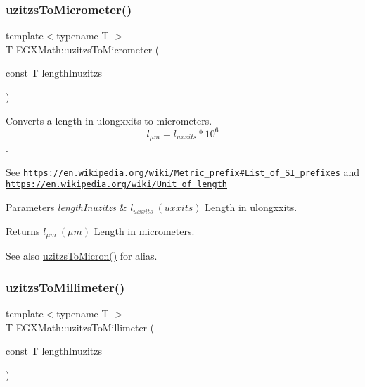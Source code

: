 \subsubsection{\texorpdfstring{uzitzs\+To\+Micrometer()}{uzitzsToMicrometer()}}
{\footnotesize\ttfamily template$<$typename T $>$ \\
T E\+G\+X\+Math\+::uzitzs\+To\+Micrometer (\begin{DoxyParamCaption}\item[{const T}]{length\+Inuzitzs }\end{DoxyParamCaption})}



Converts a length in ulongxxits to micrometers. \[ l_{\mu m}=l_{uxxits} * 10^{6} \]. 

See \href{https://en.wikipedia.org/wiki/Metric_prefix#List_of_SI_prefixes}{\tt https\+://en.\+wikipedia.\+org/wiki/\+Metric\+\_\+prefix\#\+List\+\_\+of\+\_\+\+S\+I\+\_\+prefixes} and \href{https://en.wikipedia.org/wiki/Unit_of_length}{\tt https\+://en.\+wikipedia.\+org/wiki/\+Unit\+\_\+of\+\_\+length} 
\begin{DoxyParams}{Parameters}
{\em length\+Inuzitzs} & $ l_{uxxits}\ (uxxits)$ Length in ulongxxits. \\
\hline
\end{DoxyParams}
\begin{DoxyReturn}{Returns}
$ l_{\mu m}\ (\mu m)$ Length in micrometers. 
\end{DoxyReturn}
\begin{DoxySeeAlso}{See also}
\mbox{\hyperlink{group___e_g_x_math-_conversions-_length_conversions-uzitzs-_non-_s_i_ga695a8fd8870537930d6378e99ad2aa9f}{uzitzs\+To\+Micron()}} for alias. 
\end{DoxySeeAlso}
\mbox{\label{group___e_g_x_math-_conversions-_length_conversions-uzitzs-_s_i_gaf507dd646327861da523586b417d132e}} 
\subsubsection{\texorpdfstring{uzitzs\+To\+Millimeter()}{uzitzsToMillimeter()}}
{\footnotesize\ttfamily template$<$typename T $>$ \\
T E\+G\+X\+Math\+::uzitzs\+To\+Millimeter (\begin{DoxyParamCaption}\item[{const T}]{length\+Inuzitzs }\end{DoxyParamCaption})}



